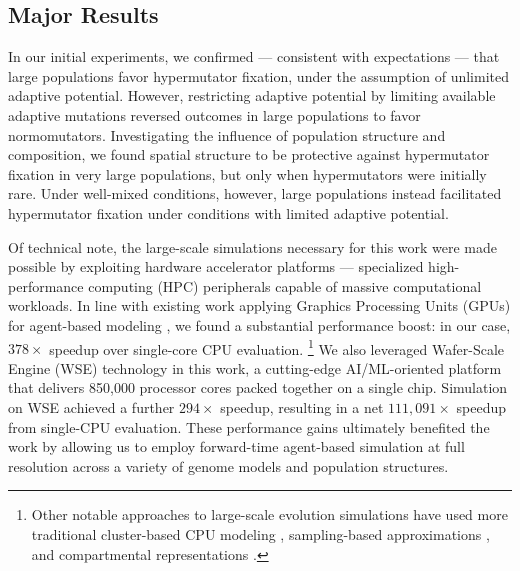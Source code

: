 \subsection{Major Results}

In our initial experiments, we confirmed --- consistent with expectations --- that large populations favor hypermutator fixation, under the assumption of unlimited adaptive potential.
However, restricting adaptive potential by limiting available adaptive mutations reversed outcomes in large populations to favor normomutators.
Investigating the influence of population structure and composition, we found spatial structure to be protective against hypermutator fixation in very large populations, but only when hypermutators were initially rare.
Under well-mixed conditions, however, large populations instead facilitated hypermutator fixation under conditions with limited adaptive potential.

Of technical note, the large-scale simulations necessary for this work were made possible by exploiting hardware accelerator platforms --- specialized high-performance computing (HPC) peripherals capable of massive computational workloads.
In line with existing work applying Graphics Processing Units (GPUs) for agent-based modeling \citep{turpin2021xaevol,kosiachenko2019mass,perumalla2009switching,heinemann2007artificial,richmond2023flame}, we found a substantial performance boost: in our case, $378\times$ speedup over single-core CPU evaluation.
\footnote{%
Other notable approaches to large-scale evolution simulations have used more traditional cluster-based CPU modeling \citep{moreno2022best,collier2015large,ray1995proposal,turpin2020paevol}, sampling-based approximations \citep{taddei1997role}, and compartmental representations \citep{tenaillon1999mutators}.}
We also leveraged Wafer-Scale Engine (WSE) technology in this work, a cutting-edge AI/ML-oriented platform that delivers 850,000 processor cores packed together on a single chip.
Simulation on WSE achieved a further $294\times$ speedup, resulting in a net $111{,}091\times$ speedup from single-CPU evaluation.
These performance gains ultimately benefited the work by allowing us to employ forward-time agent-based simulation at full resolution across a variety of genome models and population structures.
